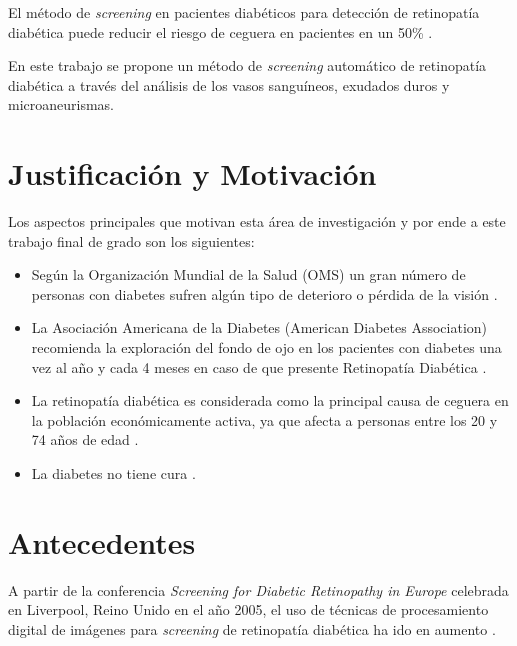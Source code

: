 El método de \textit{screening} en pacientes diabéticos para detección de retinopatía diabética puede reducir el riesgo de ceguera en pacientes en un 50\% \cite{fadia}.

En este trabajo  se propone un método de \textit{screening} automático de retinopatía diabética a través del análisis de los vasos sanguíneos, exudados duros  y microaneurismas. %


\section{Justificación y Motivación}
Los aspectos principales que motivan esta área de investigación y por ende a este trabajo final de grado son los siguientes:
\begin{itemize}


\item Según la Organización Mundial de la Salud (OMS) un gran número de  personas con diabetes sufren algún tipo de deterioro o pérdida de la visión  \cite{oms}. 

\item La  Asociación  Americana  de  la  Diabetes  (American  Diabetes  Association)  recomienda  la exploración del fondo de ojo en los pacientes con  diabetes una vez al año y cada 4 meses en caso de que presente Retinopatía Diabética \cite{cigna}.

\item La retinopatía diabética es considerada como la principal causa de ceguera en la población económicamente activa,  ya  que  afecta  a  personas  entre  los 20  y  74  años  de  edad \cite{fong2004retinopathy,browning2010diabetic}.

\item La diabetes no tiene cura \cite{kindberg1999supporting,kleinfield2006diabetes}.
\end{itemize}

\section{Antecedentes}

A partir de la  conferencia \textit{Screening for Diabetic Retinopathy in Europe} celebrada en Liverpool, Reino Unido en el año 2005, el uso de técnicas de procesamiento digital de imágenes para \textit{screening} de retinopatía diabética ha ido en aumento \cite{iqbal2006automatic}.

